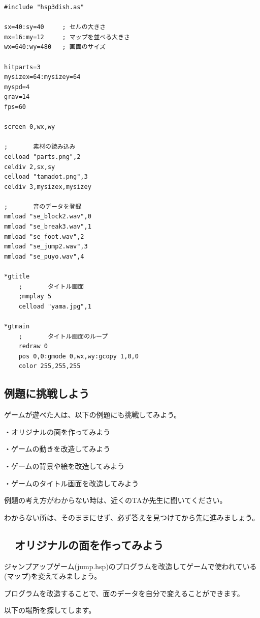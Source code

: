 \documentclass[text04.tex]{subfiles}
\begin{document}
\begin{lstlisting}[caption=jump.hspのプログラムの一部]
#include "hsp3dish.as"

sx=40:sy=40     ; セルの大きさ
mx=16:my=12     ; マップを並べる大きさ
wx=640:wy=480   ; 画面のサイズ

hitparts=3
mysizex=64:mysizey=64
myspd=4
grav=14
fps=60

screen 0,wx,wy

;       素材の読み込み
celload "parts.png",2
celdiv 2,sx,sy
celload "tamadot.png",3
celdiv 3,mysizex,mysizey

;       音のデータを登録
mmload "se_block2.wav",0
mmload "se_break3.wav",1
mmload "se_foot.wav",2
mmload "se_jump2.wav",3
mmload "se_puyo.wav",4

*gtitle
	;       タイトル画面
	;mmplay 5
	celload "yama.jpg",1

*gtmain
	;       タイトル画面のループ
	redraw 0
	pos 0,0:gmode 0,wx,wy:gcopy 1,0,0
	color 255,255,255

\end{lstlisting}

\newpage
\subsection{例題に挑戦しよう}

ゲームが遊べた人は、以下の例題にも挑戦してみよう。

・オリジナルの面を作ってみよう

・ゲームの動きを改造してみよう

・ゲームの背景や絵を改造してみよう

・ゲームのタイトル画面を改造してみよう

例題の考え方がわからない時は、近くのTAか先生に聞いてください。

わからない所は、そのままにせず、必ず答えを見つけてから先に進みましょう。

\newpage
\subsection{\useOmetoiExample　オリジナルの面を作ってみよう}


\exampleinduction

ジャンプアップゲーム(jump.hsp)のプログラムを改造してゲームで使われている(マップ)を変えてみましょう。

プログラムを改造することで、面のデータを自分で変えることができます。

以下の場所を探してします。
\end{document}
